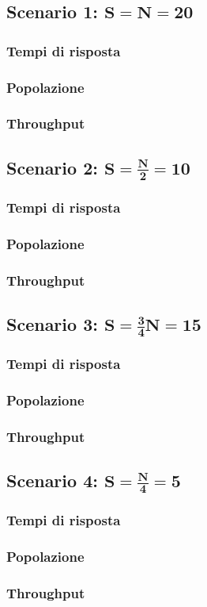 \subsection{Scenario 1: $\mathbf{S=N=20}$}
\subsubsection{Tempi di risposta}


\subsubsection{Popolazione}
\subsubsection{Throughput}
%
%
\subsection{Scenario 2: $\mathbf{S=\frac{N}{2}=10}$}
\subsubsection{Tempi di risposta}
\subsubsection{Popolazione}
\subsubsection{Throughput}
%
%
\subsection{Scenario 3: $\mathbf{S=\frac{3}{4}N=15}$}
\subsubsection{Tempi di risposta}
\subsubsection{Popolazione}
\subsubsection{Throughput}
%
%
\subsection{Scenario 4: $\mathbf{S=\frac{N}{4}=5}$}
\subsubsection{Tempi di risposta}
\subsubsection{Popolazione}
\subsubsection{Throughput}
